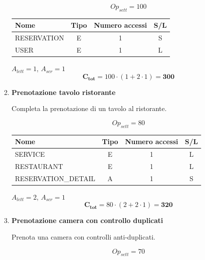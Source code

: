 \documentclass[a4paper,12pt]{report}
\begin{document}
\begin{enumerate}
    $$Op_{sett} = 100$$
    
    \begin{table}[H]
        \centering
        \small
        \renewcommand{\arraystretch}{1.15}
        \begin{tabularx}{0.8\textwidth}{|X|c|c|c|}
            \hline
            \rowcolor{gray!20}
            \textbf{Nome} & \textbf{Tipo} & \textbf{Numero accessi} & \textbf{S/L} \\
            \hline
            RESERVATION & E & 1 & S \\
            USER & E & 1 & L \\
            \hline
        \end{tabularx}
    \end{table}
    
    $A_{lett} = 1$, $A_{scr} = 1$
    $$\mathbf{C_{tot}} = 100 \cdot (1 + 2 \cdot 1) = \mathbf{300}$$

    \item {\large \textbf{Prenotazione tavolo ristorante}} \label{op14}
    
    Completa la prenotazione di un tavolo al ristorante.
    
    $$Op_{sett} = 80$$
    
    \begin{table}[H]
        \centering
        \small
        \renewcommand{\arraystretch}{1.15}
        \begin{tabularx}{0.8\textwidth}{|X|c|c|c|}
            \hline
            \rowcolor{gray!20}
            \textbf{Nome} & \textbf{Tipo} & \textbf{Numero accessi} & \textbf{S/L} \\
            \hline
            SERVICE & E & 1 & L \\
            RESTAURANT & E & 1 & L \\
            RESERVATION\_DETAIL & A & 1 & S \\
            \hline
        \end{tabularx}
    \end{table}
    
    $A_{lett} = 2$, $A_{scr} = 1$
    $$\mathbf{C_{tot}} = 80 \cdot (2 + 2 \cdot 1) = \mathbf{320}$$

    \item {\large \textbf{Prenotazione camera con controllo duplicati}} \label{op15}
    
    Prenota una camera con controlli anti-duplicati.
    
    $$Op_{sett} = 70$$
    

\end{enumerate}
\end{document}
